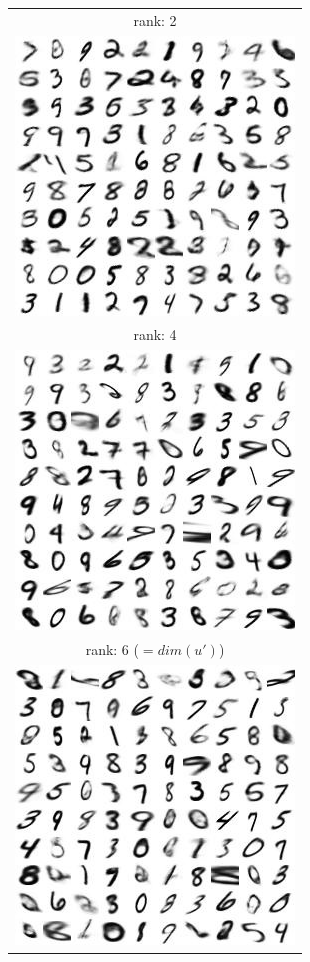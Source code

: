 \documentclass[letterpaper, twoside]{article}
\begin{document}
\begin{figure}[H]
\centering
\begin{minipage}{.5\textwidth}
\centering
\begin{tabular}{|@{}c@{}|}
\hline
rank: 2\\
\includegraphics[scale=1]{manifold_sig_47.jpg}\\ \hline
rank: 4\\
\includegraphics[scale=1]{manifold_sig_45.jpg}\\ \hline
rank: 6 ($=dim(u')$)\\
\includegraphics[scale=1]{manifold_sig_43.jpg}\\ \hline

\end{tabular}
\end{minipage}
\end{figure}
\end{document}
